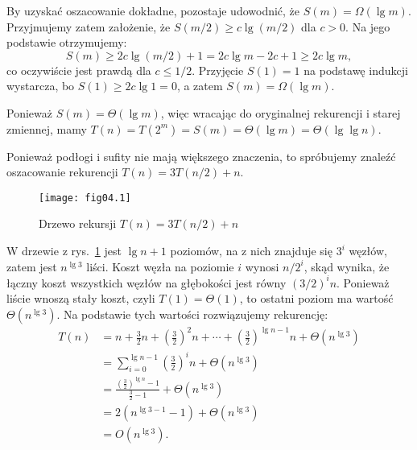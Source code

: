By uzyskać oszacowanie dokładne, pozostaje udowodnić, że $S(m)=\Omega(\lg m)$. Przyjmujemy zatem założenie, że $S(m/2)\ge c\lg(m/2)$ dla $c>0$. Na jego podstawie otrzymujemy:
\[
	S(m) \ge 2c\lg(m/2)+1 = 2c\lg m-2c+1 \ge 2c\lg m,
\]
co oczywiście jest prawdą dla $c\le1/2$. Przyjęcie $S(1)=1$ na podstawę indukcji wystarcza, bo $S(1)\ge2c\lg1=0$, a zatem $S(m)=\Omega(\lg m)$.

Ponieważ $S(m)=\Theta(\lg m)$, więc wracając do oryginalnej rekurencji i starej zmiennej, mamy $T(n)=T(2^m)=S(m)=\Theta(\lg m)=\Theta(\lg\lg n)$.


\exercise{} %
Ponieważ podłogi i sufity nie mają większego znaczenia, to spróbujemy znaleźć oszacowanie rekurencji $T(n)=3T(n/2)+n$.
\begin{figure}[ht]
	\begin{center}
		\texttt{[image: fig04.1]}
	\end{center}
	\caption{Drzewo rekursji $T(n)=3T(n/2)+n$} \label{fig:4.2-1}
\end{figure}
W drzewie z rys.~\ref{fig:4.2-1} jest $\lg n+1$ poziomów, na  z nich znajduje się $3^i$ węzłów, zatem jest $n^{\lg3}$ liści. Koszt węzła na poziomie $i$ wynosi $n/2^i$, skąd wynika, że łączny koszt wszystkich węzłów na  głębokości jest równy $(3/2)^in$. Ponieważ liście wnoszą stały koszt, czyli $T(1)=\Theta(1)$, to ostatni poziom ma wartość $\Theta(n^{\lg3})$. Na podstawie tych wartości rozwiązujemy rekurencję:
\begin{align*}
	T(n) &= n+\frac{3}{2}n+\left(\frac{3}{2}\right)^2n+\cdots+\left(\frac{3}{2}\right)^{\lg n-1}n+\Theta(n^{\lg 3}) \\
	&= \sum_{i=0}^{\lg n-1}\left(\frac{3}{2}\right)^in+\Theta(n^{\lg 3}) \\
	&= \frac{\left(\frac{3}{2}\right)^{\lg n}-1}{\frac{3}{2}-1}+\Theta(n^{\lg 3}) \\
	&= 2(n^{\lg 3-1}-1)+\Theta(n^{\lg 3}) \\
	&= O(n^{\lg 3}).
\end{align*}

